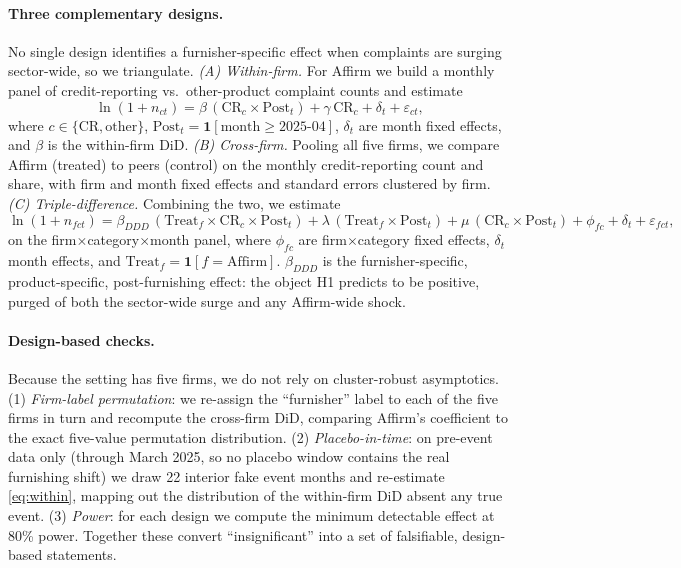 \documentclass[12pt]{article}
\begin{document}
\paragraph{Three complementary designs.} No single design identifies a furnisher-specific
effect when complaints are surging sector-wide, so we triangulate.
\emph{(A) Within-firm.} For Affirm we build a monthly panel of credit-reporting vs.\
other-product complaint counts and estimate
\begin{equation}
\ln(1+n_{ct}) = \beta\,(\text{CR}_c \times \text{Post}_t) + \gamma\,\text{CR}_c + \delta_t + \varepsilon_{ct},
\label{eq:within}
\end{equation}
where $c\in\{\text{CR},\text{other}\}$, $\text{Post}_t=\mathbf{1}[\text{month}\geq 2025\text{-}04]$,
$\delta_t$ are month fixed effects, and $\beta$ is the within-firm DiD. \emph{(B) Cross-firm.}
Pooling all five firms, we compare Affirm (treated) to peers (control) on the monthly
credit-reporting count and share, with firm and month fixed effects and standard errors
clustered by firm. \emph{(C) Triple-difference.} Combining the two, we estimate
\begin{equation}
\ln(1+n_{fct}) = \beta_{DDD}\,(\text{Treat}_f\times\text{CR}_c\times\text{Post}_t)
+ \lambda\,(\text{Treat}_f\times\text{Post}_t) + \mu\,(\text{CR}_c\times\text{Post}_t)
+ \phi_{fc} + \delta_t + \varepsilon_{fct},
\label{eq:ddd}
\end{equation}
on the firm$\times$category$\times$month panel, where $\phi_{fc}$ are firm$\times$category fixed
effects, $\delta_t$ month effects, and $\text{Treat}_f=\mathbf{1}[f=\text{Affirm}]$.
$\beta_{DDD}$ is the furnisher-specific, product-specific, post-furnishing effect: the object H1
predicts to be positive, purged of both the sector-wide surge and any Affirm-wide shock.

\paragraph{Design-based checks.} Because the setting has five firms, we do not rely on
cluster-robust asymptotics. (1) \emph{Firm-label permutation}: we re-assign the ``furnisher''
label to each of the five firms in turn and recompute the cross-firm DiD, comparing Affirm's
coefficient to the exact five-value permutation distribution. (2) \emph{Placebo-in-time}: on
pre-event data only (through March 2025, so no placebo window contains the real furnishing
shift) we draw 22 interior fake event months and re-estimate \eqref{eq:within}, mapping out the
distribution of the within-firm DiD absent any true event. (3) \emph{Power}: for each design we
compute the minimum detectable effect at 80\% power. Together these convert ``insignificant''
into a set of falsifiable, design-based statements.
\end{document}

